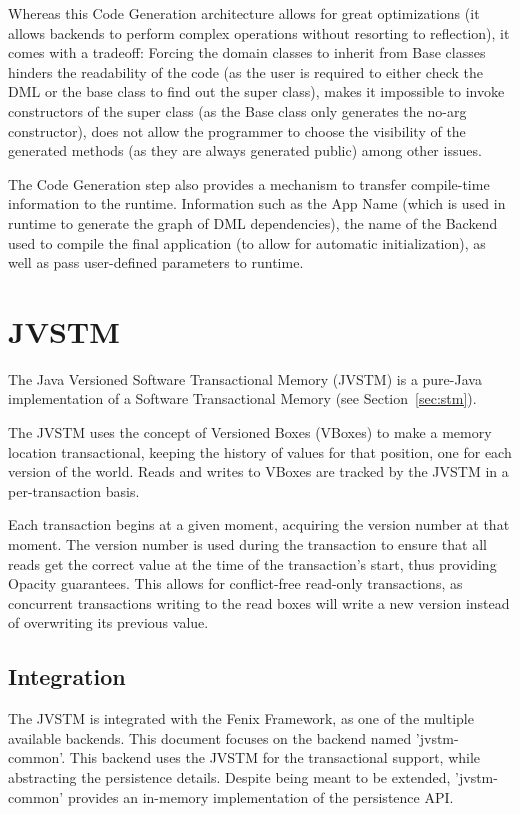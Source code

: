 Whereas this Code Generation architecture allows for great
optimizations (it allows backends to perform complex operations
without resorting to reflection), it comes with a tradeoff: Forcing
the domain classes to inherit from Base classes hinders the
readability of the code (as the user is required to either check the
DML or the base class to find out the super class), makes it
impossible to invoke constructors of the super class (as the Base
class only generates the no-arg constructor), does not allow the
programmer to choose the visibility of the generated methods (as they
are always generated public) among other issues.

The Code Generation step also provides a mechanism to transfer
compile-time information to the runtime. Information such as the App
Name (which is used in runtime to generate the graph of DML
dependencies), the name of the Backend used to compile the final
application (to allow for automatic initialization), as well as pass
user-defined parameters to runtime.

\section{JVSTM}
\label{sec:jvstm}

The Java Versioned Software Transactional Memory (JVSTM)
\cite{cachopo2006versioned} is a pure-Java implementation of a
Software Transactional Memory (see Section~\ref{sec:stm}).

The JVSTM uses the concept of Versioned Boxes (VBoxes) to make a
memory location transactional, keeping the history of values for that
position, one for each version of the world. Reads and writes to
VBoxes are tracked by the JVSTM in a per-transaction basis.

Each transaction begins at a given moment, acquiring the version
number at that moment. The version number is used during the
transaction to ensure that all reads get the correct value at the time
of the transaction's start, thus providing Opacity guarantees. This
allows for conflict-free read-only transactions, as concurrent
transactions writing to the read boxes will write a new version
instead of overwriting its previous value.

\subsection{Integration}

The JVSTM is integrated with the Fenix Framework, as one of the
multiple available backends. This document focuses on the backend
named 'jvstm-common'. This backend uses the JVSTM for the
transactional support, while abstracting the persistence
details. Despite being meant to be extended, 'jvstm-common' provides
an in-memory implementation of the persistence API.

